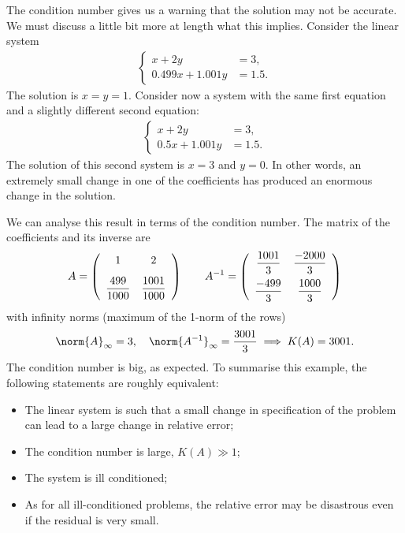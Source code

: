 The condition number gives us a warning that the solution may not be
accurate.     We must discuss a little bit more at length what this
implies.     Consider the linear system
%
\begin{align}
  \left\{
    \begin{aligned}
      x + 2 y & = 3 , \\ 
      0.499 x + 1.001 y & = 1.5 .
    \end{aligned} \right.
 \label{ill_cond_1}
\end{align}
%
The solution is $x = y = 1$.       Consider now a system with the same
first equation and a slightly different second equation:
%
\begin{align}
  \left\{
    \begin{aligned}
      x + 2 y & = 3 , \\ 
      0.5 x + 1.001 y & = 1.5 .
    \end{aligned} \right.
 \label{ill_cond_2}
\end{align}
%
The solution of this second system is $x = 3$ and $y=0$.    In other
words, an extremely small change in one of the coefficients has
produced an enormous change in the solution.

We can analyse this result in terms of the condition number.   The
matrix of the coefficients and its inverse are
%
\begin{equation*}
  A = 
  \left ( 
   \begin{array}{c c}
    1 & 2 \\*[3mm]
    \dfrac{499}{1000} & \dfrac{1001}{1000} \\
   \end{array}
  \right )
  \qquad
  A^{-1} = 
  \left ( 
   \begin{array}{c c}
     \dfrac{1001}{3} & \dfrac{-2000}{3} \\*[3mm]
     \dfrac{-499}{3} & \dfrac{1000}{3} \\
   \end{array}
  \right )
\end{equation*}
% 
with infinity norms (maximum of the 1-norm of the rows)
%
\begin{equation*}
  \norm{ A }_\infty = 3 , \quad \norm{ A^{-1} }_\infty = \frac{3001}{3} 
  \implies K(A) = 3001 .
\end{equation*}
%
The condition number is big, as expected. To summarise this example,
the following statements are roughly equivalent:
%
\begin{itemize}
%
\item The linear system is such that a small change in specification of
the problem can lead to a large change in relative error; \par
%
\item The condition number is large, $K(A) \gg 1$; \par
%
\item The system is ill conditioned; \par
%
\item As for all ill-conditioned problems, the relative error may be
disastrous even if the residual is very small.
%
\end{itemize}

